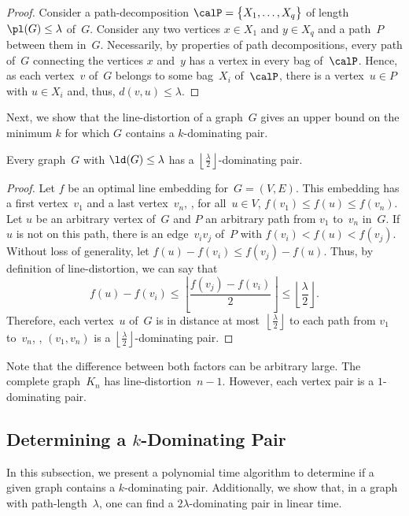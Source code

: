 \begin{proof}
Consider a path-decomposition $\calP = \big \{ X_1, \ldots, X_q \big \}$ of length~$\pl(G) \leq \lambda$ of~$G$.
Consider any two vertices $x \in X_1$ and $y \in X_q$ and a path~$P$ between them in~$G$.
Necessarily, by properties of path decompositions, every path of~$G$ connecting the vertices $x$ and~$y$ has a vertex in every bag of~$\calP$.
Hence, as each vertex~$v$ of~$G$ belongs to some bag~$X_{i}$ of~$\calP$, there is a vertex~$u \in P$ with $u \in X_i$ and, thus, $d(v,u) \leq \lambda$.
\end{proof}

Next, we show that the line-distortion of a graph~$G$ gives an upper bound on the minimum $k$ for which $G$ contains a $k$-dominating pair.

\begin{lemma}
    \label{lem:ldDomPairRelation}
Every graph~\( G \) with \( \ld(G) \leq \lambda \) has a \( \left \lfloor \frac{\lambda}{2} \right \rfloor \)-dominating pair.
\end{lemma}

\begin{proof}
Let $f$ be an optimal line embedding for~$G = (V, E)$.
This embedding has a first vertex~$v_1$ and a last vertex~$v_n$, \ie, for all~$u \in V$, $f(v_1) \leq f(u) \leq f(v_n)$.
Let $u$ be an arbitrary vertex of~$G$ and $P$ an arbitrary path from $v_1$ to~$v_n$ in~$G$.
If $u$ is not on this path, there is an edge~$v_iv_j$ of~$P$ with $f(v_i) < f(u) < f(v_j)$.
Without loss of generality, let $f(u) - f(v_i) \leq f(v_j) - f(u)$.
Thus, by definition of line-distortion, we can say that
\[
    f(u) - f(v_i) \leq \left \lfloor \frac{f(v_j) - f(v_i)}{2} \right \rfloor \leq \left \lfloor \frac{\lambda}{2} \right \rfloor.
\]
Therefore, each vertex~$u$ of~$G$ is in distance at most~$\left \lfloor \frac{\lambda}{2} \right \rfloor$ to each path from $v_1$ to~$v_n$, \ie, $(v_1, v_n)$ is a $\left \lfloor \frac{\lambda}{2} \right \rfloor$-dominating pair.
\end{proof}

Note that the difference between both factors can be arbitrary large.
The complete graph~$K_n$ has line-distortion~$n - 1$.
However, each vertex pair is a $1$-dominating pair.

\subsection{Determining a $k$-Dominating Pair}

In this subsection, we present a polynomial time algorithm to determine if a given graph contains a $k$-dominating pair.
Additionally, we show that, in a graph with path-length~$\lambda$, one can find a $2 \lambda$-dominating pair in linear time.

